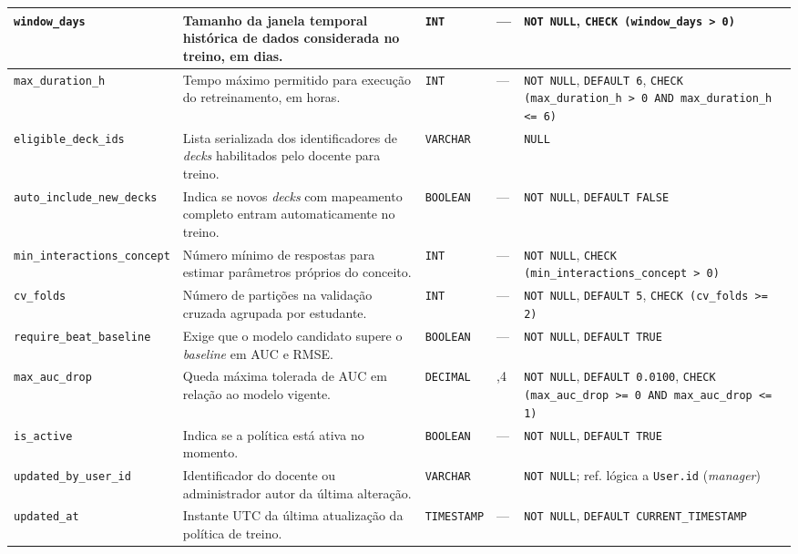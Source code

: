 \begin{anexosenv}
{\begin{longtable}{>{\raggedright\arraybackslash}p{3.0cm}>{\raggedright\arraybackslash}p{4.9cm}>{\raggedright\arraybackslash}p{1.75cm}>{\centering\arraybackslash}p{0.95cm}>{\raggedright\arraybackslash}p{3.7cm}}
\hline
\texttt{window\_\allowbreak days} & Tamanho da janela temporal histórica de dados considerada no treino, em dias. & \texttt{INT} & --- & \texttt{NOT NULL}, \texttt{CHECK (window\_\allowbreak days > 0)} \\
\hline
\texttt{max\_\allowbreak duration\_\allowbreak h} & Tempo máximo permitido para execução do retreinamento, em horas. & \texttt{INT} & --- & \texttt{NOT NULL}, \texttt{DEFAULT 6}, \texttt{CHECK (max\_\allowbreak duration\_\allowbreak h > 0 AND max\_\allowbreak duration\_\allowbreak h <= 6)} \\
\hline
\texttt{eligible\_\allowbreak deck\_\allowbreak ids} & Lista serializada dos identificadores de \textit{decks} habilitados pelo docente para treino. & \texttt{VARCHAR} & 4000 & \texttt{NULL} \\
\hline
\texttt{auto\_\allowbreak include\_\allowbreak new\_\allowbreak decks} & Indica se novos \textit{decks} com mapeamento completo entram automaticamente no treino. & \texttt{BOOLEAN} & --- & \texttt{NOT NULL}, \texttt{DEFAULT FALSE} \\
\hline
\texttt{min\_\allowbreak interactions\_\allowbreak concept} & Número mínimo de respostas para estimar parâmetros próprios do conceito. & \texttt{INT} & --- & \texttt{NOT NULL}, \texttt{CHECK (min\_\allowbreak interactions\_\allowbreak concept > 0)} \\
\hline
\texttt{cv\_\allowbreak folds} & Número de partições na validação cruzada agrupada por estudante. & \texttt{INT} & --- & \texttt{NOT NULL}, \texttt{DEFAULT 5}, \texttt{CHECK (cv\_\allowbreak folds >= 2)} \\
\hline
\texttt{require\_\allowbreak beat\_\allowbreak baseline} & Exige que o modelo candidato supere o \textit{baseline} em AUC e RMSE. & \texttt{BOOLEAN} & --- & \texttt{NOT NULL}, \texttt{DEFAULT TRUE} \\
\hline
\texttt{max\_\allowbreak auc\_\allowbreak drop} & Queda máxima tolerada de AUC em relação ao modelo vigente. & \texttt{DECIMAL} & 5,4 & \texttt{NOT NULL}, \texttt{DEFAULT 0.0100}, \texttt{CHECK (max\_\allowbreak auc\_\allowbreak drop >= 0 AND max\_\allowbreak auc\_\allowbreak drop <= 1)} \\
\hline
\texttt{is\_\allowbreak active} & Indica se a política está ativa no momento. & \texttt{BOOLEAN} & --- & \texttt{NOT NULL}, \texttt{DEFAULT TRUE} \\
\hline
\texttt{updated\_\allowbreak by\_\allowbreak user\_\allowbreak id} & Identificador do docente ou administrador autor da última alteração. & \texttt{VARCHAR} & 64 & \texttt{NOT NULL}; ref. lógica a \texttt{User.id} (\textit{manager}) \\
\hline
\texttt{updated\_\allowbreak at} & Instante UTC da última atualização da política de treino. & \texttt{TIMESTAMP} & --- & \texttt{NOT NULL}, \texttt{DEFAULT CURRENT\_\allowbreak TIMESTAMP} \\
\hline
\end{longtable}

}
\end{anexosenv}
